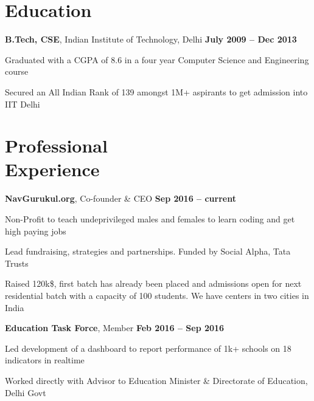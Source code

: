 \documentclass[margin,line]{resume}
\begin{document}
\begin{resume}
    \section{\mysidestyle Education}

    \textbf{B.Tech, CSE}, Indian Institute of Technology, Delhi \hfill \textbf{July 2009 -- Dec 2013}
    \begin{list2}
        \item Graduated with a CGPA of 8.6 in a four year Computer Science and Engineering course
        \item Secured an All Indian Rank of 139 amongst 1M+ aspirants to get admission into IIT Delhi
    \end{list2}\vspace{-1.5mm}

    \section{\mysidestyle Professional\\Experience}
    \textbf{NavGurukul.org}, Co-founder \& CEO \hfill \textbf{Sep 2016 -- current}
    \begin{list2}
        \item Non-Profit to teach undeprivileged males and females to learn coding and get high paying jobs
        \item Lead fundraising, strategies and partnerships. Funded by Social Alpha, Tata Trusts
        \item Raised 120k\$, first batch has already been placed and admissions open for next residential batch with a capacity of 100 students. We have centers in two cities in India
    \end{list2}\vspace{-1.5mm}

    \textbf{Education Task Force}, Member \hfill \textbf{Feb 2016 -- Sep 2016}
    \begin{list2}
        \item Led development of a dashboard to report performance of 1k+ schools on 18 indicators in realtime
        \item Worked directly with Advisor to Education Minister \& Directorate of Education, Delhi Govt
    \end{list2}\vspace{-1.5mm}


\end{resume}
\end{document}
